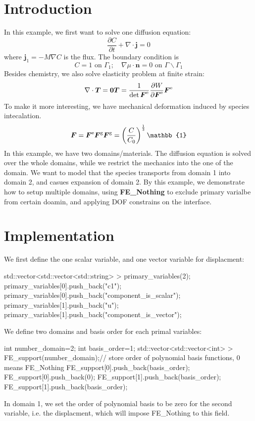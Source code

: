\hypertarget{growth_Introduction}{}\section{Introduction}\label{growth_Introduction}
In this example, we first want to solve one diffusion equation\-: \[ \frac{\partial C}{\partial t}+\nabla\cdot\boldsymbol{j}=0 \] where $\boldsymbol{j}_1=-M\nabla C$ is the flux. The boundary condition is \[ C=1 \text{ on }\Gamma_1; \quad \nabla \mu\cdot\boldsymbol{n}=0 \text{ on }\Gamma \backslash \Gamma_1 \] Besides chemistry, we also solve elasticity problem at finite strain\-: \[ \nabla\cdot\boldsymbol{T} = \boldsymbol{0}\\ \boldsymbol{T}= \frac{1}{\det{\boldsymbol{F}^{\text{e}}}}\frac{\partial W}{\partial \boldsymbol{F}^{\text{e}}}\boldsymbol{F}^{\text{e}} \] To make it more interesting, we have mechanical deformation induced by species intecalation. \[ \boldsymbol{F}=\boldsymbol{F}^{\text{e}}\boldsymbol{F}^{\text{g}}\\ \boldsymbol{F}^{\text{g}}=\left(\frac{C}{C_\text{0}}\right)^{\frac{1}{3}}\mathbb{1} \] In this example, we have two domains/materials. The diffusion equation is solved over the whole domains, while we restrict the mechanics into the one of the domain. We want to model that the species transports from domain 1 into domain 2, and casues expansion of domain 2. By this example, we demonstrate how to setup multiple domains, using {\bfseries F\-E\-\_\-\-Nothing} to exclude primary varialbe from certain doamin, and applying D\-O\-F constrains on the interface.\hypertarget{growth_imple}{}\section{Implementation}\label{growth_imple}
We first define the one scalar variable, and one vector variable for displacment\-: 
\begin{DoxyCode}
std::vector<std::vector<std::string> > primary\_variables(2);        
      primary\_variables[0].push\_back(\textcolor{stringliteral}{"c1"}); primary\_variables[0].push\_back(\textcolor{stringliteral}{"component\_is\_scalar"});
      primary\_variables[1].push\_back(\textcolor{stringliteral}{"u"}); primary\_variables[1].push\_back(\textcolor{stringliteral}{"component\_is\_vector"});
\end{DoxyCode}
 We define two domains and basis order for each primal variables\-: 
\begin{DoxyCode}
\textcolor{keywordtype}{int} number\_domain=2;
\textcolor{keywordtype}{int} basis\_order=1;
std::vector<std::vector<int> > FE\_support(number\_domain);\textcolor{comment}{// store order of polynomial basis functions, 0
       means FE\_Nothing   }
FE\_support[0].push\_back(basis\_order);
FE\_support[0].push\_back(0);
FE\_support[1].push\_back(basis\_order);
FE\_support[1].push\_back(basis\_order);
\end{DoxyCode}
 In domain 1, we set the order of polynomial basis to be zero for the second variable, i.\-e. the displacment, which will impose F\-E\-\_\-\-Nothing to this field.

